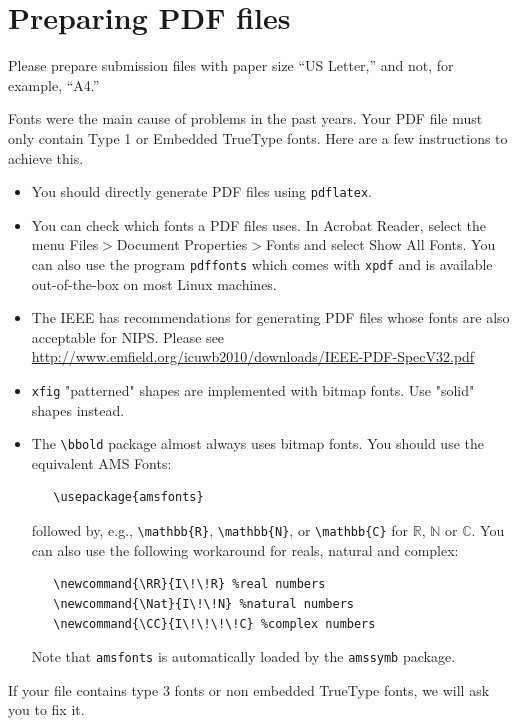 \documentclass{article}
\def\CC{{C\nolinebreak[4]\hspace{-.05em}\raisebox{.4ex}{\tiny\bf ++}}}
\begin{document}
\section{Preparing PDF files}

Please prepare submission files with paper size ``US Letter,'' and
not, for example, ``A4.''

Fonts were the main cause of problems in the past years. Your PDF file
must only contain Type 1 or Embedded TrueType fonts. Here are a few
instructions to achieve this.

\begin{itemize}

\item You should directly generate PDF files using \verb+pdflatex+.

\item You can check which fonts a PDF files uses.  In Acrobat Reader,
  select the menu Files$>$Document Properties$>$Fonts and select Show
  All Fonts. You can also use the program \verb+pdffonts+ which comes
  with \verb+xpdf+ and is available out-of-the-box on most Linux
  machines.

\item The IEEE has recommendations for generating PDF files whose
  fonts are also acceptable for NIPS. Please see
  \url{http://www.emfield.org/icuwb2010/downloads/IEEE-PDF-SpecV32.pdf}

\item \verb+xfig+ "patterned" shapes are implemented with bitmap
  fonts.  Use "solid" shapes instead.

\item The \verb+\bbold+ package almost always uses bitmap fonts.  You
  should use the equivalent AMS Fonts:
\begin{verbatim}
   \usepackage{amsfonts}
\end{verbatim}
followed by, e.g., \verb+\mathbb{R}+, \verb+\mathbb{N}+, or
\verb+\mathbb{C}+ for $\mathbb{R}$, $\mathbb{N}$ or $\mathbb{C}$.  You
can also use the following workaround for reals, natural and complex:
\begin{verbatim}
   \newcommand{\RR}{I\!\!R} %real numbers
   \newcommand{\Nat}{I\!\!N} %natural numbers
   \newcommand{\CC}{I\!\!\!\!C} %complex numbers
\end{verbatim}
Note that \verb+amsfonts+ is automatically loaded by the
\verb+amssymb+ package.

\end{itemize}

If your file contains type 3 fonts or non embedded TrueType fonts, we
will ask you to fix it.
\end{document}
